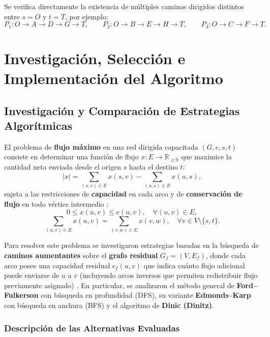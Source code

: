 \documentclass[11pt,a4paper]{article}
\begin{document}
Se verifica directamente la existencia de múltiples caminos dirigidos distintos entre $s = O$ y $t = T$, por ejemplo:
\[
    P_1: O \to A \to D \to G \to T, \qquad P_2: O \to B \to E \to H \to T, \qquad P_3: O \to C \to F \to T.
\]

\section{Investigación, Selección e Implementación del Algoritmo}

\subsection{Investigación y Comparación de Estrategias Algorítmicas}

El problema de \textbf{flujo máximo} en una red dirigida capacitada $(G, c, s, t)$ consiste en determinar una función de flujo $x: E \longrightarrow \mathbb{R}_{\ge 0}$ que maximice la cantidad neta enviada desde el origen $s$ hasta el destino $t$:
\[
    |x| = \sum_{(s,v) \in E} x(s, v) - \sum_{(u,s) \in E} x(u, s),
\]
sujeta a las restricciones de \textbf{capacidad} en cada arco y de \textbf{conservación de flujo} en todo vértice intermedio \cite{cormen,ahuja}:
\[
    0 \le x(u, v) \le c(u, v), \quad \forall (u, v) \in E,
\]
\[
    \sum_{(u,v) \in E} x(u, v) = \sum_{(v,w) \in E} x(v, w), \quad \forall v \in V \setminus \{s, t\}.
\]

Para resolver este problema se investigaron estrategias basadas en la búsqueda de \textbf{caminos aumentantes} sobre el \textbf{grafo residual} $G_f = (V, E_f)$, donde cada arco posee una capacidad residual $c_f(u, v)$ que indica cuánto flujo adicional puede enviarse de $u$ a $v$ (incluyendo arcos inversos que permiten redistribuir flujo previamente asignado) \cite{ford1956,cormen}. En particular, se analizaron el método general de \textbf{Ford--Fulkerson} con búsqueda en profundidad (DFS), su variante \textbf{Edmonds--Karp} con búsqueda en anchura (BFS) y el algoritmo de \textbf{Dinic (Dinitz)}.

\subsubsection{Descripción de las Alternativas Evaluadas}
\end{document}
